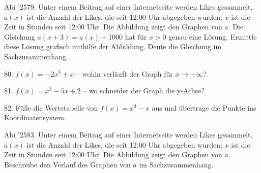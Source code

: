 \documentclass[11pt]{article}
\begin{document}
\begin{pfaufg}{Abi ’25}{79.}{}
Unter einem Beitrag auf einer Internetseite werden Likes gesammelt. $a(x)$ ist die Anzahl der Likes, die seit 12:00 Uhr abgegeben wurden; $x$ ist die Zeit in Stunden seit 12:00 Uhr. Die Abbildung zeigt den Graphen von $a$. Die Gleichung $a(x + 3) = a(x) + 1000$ hat für $x > 0$ genau eine Lösung. Ermittle diese Lösung grafisch mithilfe der Abbildung. Deute die Gleichung im Sachzusammenhang.
\par\smallskip\noindent {}\par
{}
\end{pfaufg}
\begin{pfaufg}{}{80.}{}
$f(x) = -2x^4 + x$ – wohin verläuft der Graph für $x \to +\infty$? 
\end{pfaufg}
\begin{pfaufg}{}{81.}{}
$f(x) = x^3 - 5x + 2$ – wo schneidet der Graph die y-Achse? 
\end{pfaufg}
\pfgruppe{}
\begin{pfaufg}{}{82.}{}
Fülle die Wertetabelle von $f(x) = x^3 - x$ aus und übertrage die Punkte ins Koordinatensystem.
\par\smallskip\noindent {}\begin{ksys}[xmin=-3,xmax=3,ymin=-7,ymax=7]\end{ksys}\par
\end{pfaufg}
\pfgruppe{}
\begin{pfaufg}{Abi ’25}{83.}{}
Unter einem Beitrag auf einer Internetseite werden Likes gesammelt. $a(x)$ ist die Anzahl der Likes, die seit 12:00 Uhr abgegeben wurden; $x$ ist die Zeit in Stunden seit 12:00 Uhr. Die Abbildung zeigt den Graphen von $a$. Beschreibe den Verlauf des Graphen von $a$ im Sachzusammenhang.
\par\smallskip\noindent {}\par
{}
\end{pfaufg}
\end{document}
